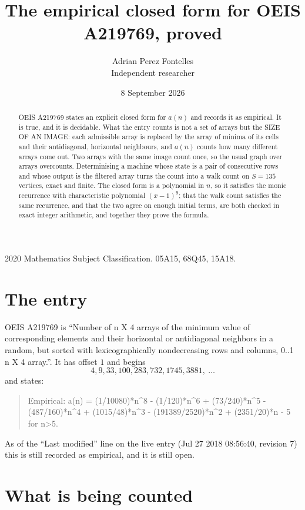 \documentclass[11pt,a4paper]{article}
\title{The empirical closed form for OEIS A219769, proved}
\author{Adrian Perez Fontelles\\ \small Independent researcher}
\date{8 September 2026}
\theoremstyle{plain}
\theoremstyle{definition}
\begin{document}
\maketitle

\begin{abstract}
OEIS A219769 states an explicit closed form for $a(n)$ and records it as empirical. It is true, and
it is decidable. What the entry counts is not a set of arrays but the SIZE OF AN IMAGE: each
admissible array is replaced by the array of minima of its cells and their antidiagonal, horizontal neighbours,
and $a(n)$ counts how many different arrays come out. Two arrays with the same image count
once, so the usual graph over arrays overcounts. Determinising a machine whose state is a pair
of consecutive rows and whose output is the filtered array turns the count into a walk count on
$S=135$ vertices, exact and finite. The closed form is a polynomial in $n$, so it satisfies the
monic recurrence with characteristic polynomial $(x-1)^{9}$; that the walk count
satisfies the same recurrence, and that the two agree on enough initial terms, are both checked
in exact integer arithmetic, and together they prove the formula.
\end{abstract}

\noindent\small 2020 Mathematics Subject Classification. 05A15, 68Q45, 15A18.\normalsize

\section{The entry}

OEIS A219769 is ``Number of n X 4 arrays of the minimum value of corresponding elements and their horizontal or antidiagonal neighbors in a random, but sorted with lexicographically nondecreasing rows and columns, 0..1 n X 4 array.''. It has offset $1$ and begins
\[
4, 9, 33, 100, 283, 732, 1745, 3881,\ \dots
\]
and states:
\begin{quote}
Empirical: a(n) = (1/10080)*n\^{}8 - (1/120)*n\^{}6 + (73/240)*n\^{}5 - (487/160)*n\^{}4 + (1015/48)*n\^{}3 - (191389/2520)*n\^{}2 + (2351/20)*n - 5 for n>5.
\end{quote}
As of the ``Last modified'' line on the live entry (Jul 27 2018 08:56:40, revision 7)
this is still recorded as empirical, and it is still open.

\section{What is being counted}
\end{document}
